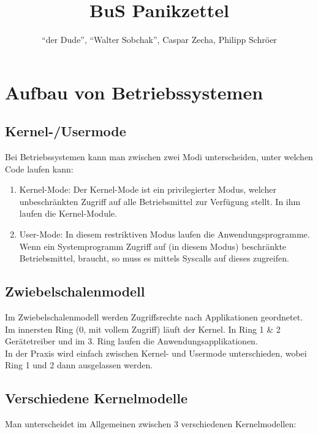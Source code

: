 \documentclass[11pt]{scrartcl}
\title{BuS Panikzettel}
\author{``der Dude'', ``Walter Sobchak'', Caspar Zecha, Philipp Schröer}
\begin{document}
\maketitle
\let\thefootnote\relax{}

\setcounter{tocdepth}{2}
\tableofcontents

\section{Aufbau von Betriebssystemen}

\subsection{Kernel-/Usermode}
Bei Betriebssystemen kann man zwischen zwei Modi unterscheiden, unter welchen Code laufen kann:

\begin{enumerate}
\item{Kernel-Mode: Der Kernel-Mode ist ein privilegierter Modus, welcher unbeschränkten Zugriff auf alle Betriebsmittel zur Verfügung stellt. In ihm laufen die Kernel-Module.}
\item{User-Mode: In diesem restriktiven Modus laufen die Anwendungsprogramme. Wenn ein Systemprogramm Zugriff auf (in diesem Modus) beschränkte Betriebsmittel, braucht, so muss es mittels Syscalls auf dieses zugreifen.}
\end{enumerate}

\subsection{Zwiebelschalenmodell}
Im Zwiebelschalenmodell werden Zugriffsrechte nach Applikationen geordnetet. Im innersten Ring (0, mit vollem Zugriff) läuft der Kernel. In Ring 1  \& 2 Gerätetreiber und im 3. Ring laufen die Anwendungsapplikationen. \\

In der Praxis wird einfach zwischen Kernel- und Usermode unterschieden, wobei Ring 1 und 2 dann ausgelassen werden.

\subsection{Verschiedene Kernelmodelle}
Man unterscheidet im Allgemeinen zwischen 3 verschiedenen Kernelmodellen:
\end{document}
